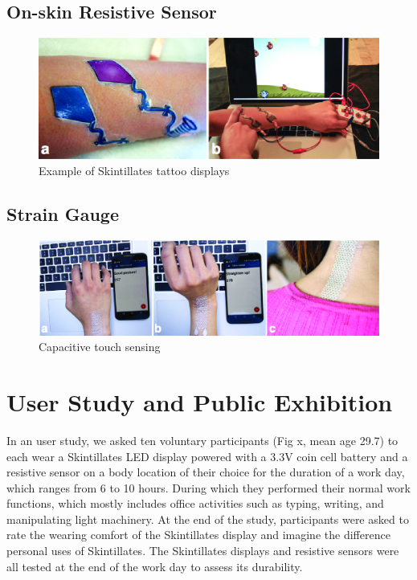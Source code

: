 \documentclass{sigchi}
\begin{document}
\subsection {On-skin Resistive Sensor}
\begin{figure}[!h]
\centering
\includegraphics[width=1\columnwidth]{figures/Figure8}
\caption{Example of Skintillates tattoo displays}
\label{fig:figure8}
\end{figure}

\subsection {Strain Gauge}
\begin{figure}[!h]
\centering
\includegraphics[width=1.0\textwidth]{figures/Figure9}
\caption{Capacitive touch sensing}
\label{fig:figure9}
\end{figure}
\section {User Study and Public Exhibition}
In an user study, we asked ten voluntary participants (Fig x, mean age 29.7) to each wear a Skintillates LED display powered with a 3.3V coin cell battery and a resistive sensor on a body location of their choice for the duration of a work day, which ranges from 6 to 10 hours. During which they performed their normal work functions, which mostly includes office activities such as typing, writing, and manipulating light machinery. At the end of the study, participants were asked to rate the wearing comfort of the Skintillates display and imagine the difference personal uses of Skintillates. The Skintillates displays and resistive sensors were all tested at the end of the work day to assess its durability. 
\end{document}
